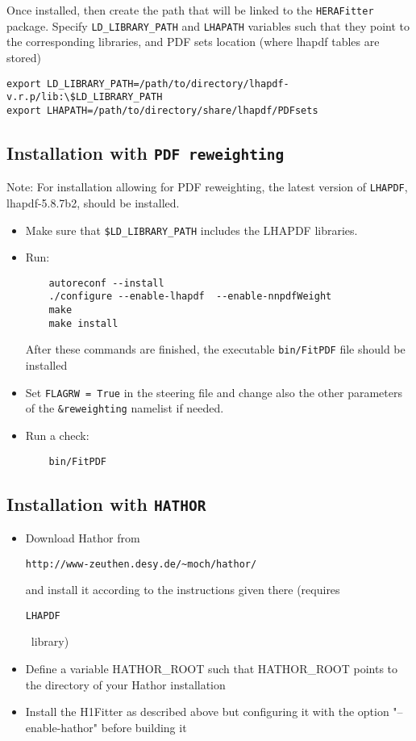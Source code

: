 \documentclass[11pt,a4paper]{article}
\begin{document}
Once installed, then create the path that will be linked to the {\tt HERAFitter} package.
 Specify {\tt LD\_LIBRARY\_PATH} 
     and {\tt LHAPATH} variables such that they
 point to the corresponding libraries, and PDF sets location (where lhapdf tables are stored)
\begin{verbatim}
export LD_LIBRARY_PATH=/path/to/directory/lhapdf-v.r.p/lib:\$LD_LIBRARY_PATH
export LHAPATH=/path/to/directory/share/lhapdf/PDFsets
\end{verbatim}



\subsection{Installation with {\tt PDF reweighting}}\label{sec:install_nnpdfrweight}

Note: For installation allowing for PDF reweighting, the latest version of {\tt LHAPDF}, lhapdf-5.8.7b2, should be installed.

\begin{itemize}
\item Make sure that {\tt \$LD\_LIBRARY\_PATH} includes the LHAPDF libraries.
\item Run:
\begin{verbatim}
    autoreconf --install
    ./configure --enable-lhapdf  --enable-nnpdfWeight
    make 
    make install
\end{verbatim}
After these commands are finished, the executable {\tt bin/FitPDF} 
file should be installed
\item Set {\tt FLAGRW = True} in the steering file and change also the other parameters of the {\tt \&reweighting} namelist if needed.
\item  Run a check:
\begin{verbatim}
    bin/FitPDF 
\end{verbatim}
\end{itemize}


\subsection{Installation with {\tt HATHOR}}

 \begin{itemize}
  \item Download Hathor from 
\begin{verbatim}
http://www-zeuthen.desy.de/~moch/hathor/
\end{verbatim}
     and install it according to the instructions given there
     (requires \begin{verbatim}LHAPDF \end{verbatim}\ library)

  \item Define a variable HATHOR\_ROOT  such that HATHOR\_ROOT  points to the
     directory of your Hathor installation

  \item Install the H1Fitter as described above but configuring it
     with the option "--enable-hathor" before building it
 \end{itemize}
\end{document}
